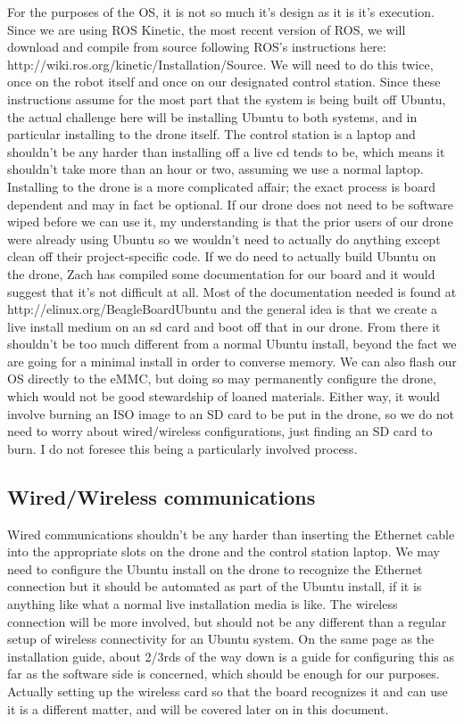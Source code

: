 \documentclass[IEEEtran,letterpaper,10pt,titlepage,draftclsnofoot,onecolumn]{article}
\begin{document}
For the purposes of the OS, it is not so much it's design as it is it's execution. 
Since we are using ROS Kinetic, the most recent version of ROS, we will download and compile from source following ROS's instructions here: http://wiki.ros.org/kinetic/Installation/Source. 
We will need to do this twice, once on the robot itself and once on our designated control station. 
Since these instructions assume for the most part that the system is being built off Ubuntu, the actual challenge here will be installing Ubuntu to both systems, and in particular installing to the drone itself. 
The control station is a laptop and shouldn't be any harder than installing off a live cd tends to be, which means it shouldn't take more than an hour or two, assuming we use a normal laptop. 
Installing to the drone is a more complicated affair; the exact process is board dependent and may in fact be optional. 
If our drone does not need to be software wiped before we can use it, my understanding is that the prior users of our drone were already using Ubuntu so we wouldn't need to actually do anything except clean off their project-specific code. 
If we do need to actually build Ubuntu on the drone, Zach has compiled some documentation for our board and it 
would suggest that it's not difficult at all. 
Most of the documentation needed is found at http://elinux.org/BeagleBoardUbuntu and the general idea is that we create a live install medium on an sd card and boot off that in our drone. 
From there it shouldn't be too much different from a normal 
Ubuntu install, beyond the fact we are going for a minimal install in order to converse memory. 
We can also flash our OS directly to the eMMC, but doing so may permanently configure the drone, which 
would not be good stewardship of loaned materials. 
Either way, it would involve burning an ISO image to an SD card to be put in the drone, so we do not need to worry about wired/wireless configurations, just finding an SD card to burn. I do not foresee this being a particularly involved process.

\subsection*{Wired/Wireless communications}

Wired communications shouldn't be any harder than inserting the Ethernet cable into the appropriate slots on the drone and the control station laptop. 
We may need to configure the Ubuntu install on the drone to recognize the Ethernet connection but it should be automated as
part of the Ubuntu install, if it is anything like what a normal live installation media is like. 
The wireless connection will be more involved, but should not be any different than a regular setup of wireless connectivity 
for an Ubuntu system. 
On the same page as the installation guide, about 2/3rds of the way down is a guide for configuring this as far as the software 
side is concerned, which should be enough for our purposes.
Actually setting up the wireless card so that the board recognizes it and can use it is a different matter, and will be covered
later on in this document.
\end{document}
